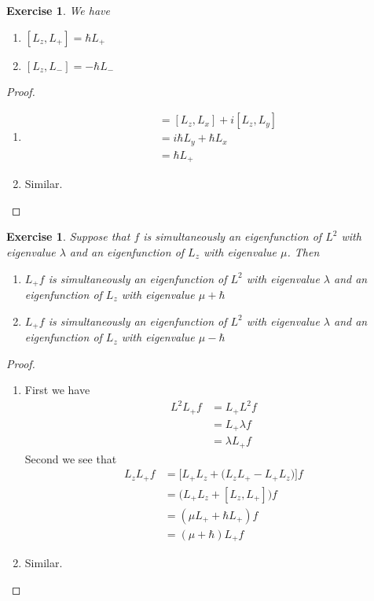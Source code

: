 \documentclass[12pt]{amsart}
\newtheorem{ex}[thm]{Exercise}
\newcommand{\lam}{\lambda}
\begin{document}
\begin{ex} We have 
\begin{enumerate}
\item $[L_z,L_+] = \hbar L_+$
\item $[L_z, L_-] = -\hbar L_-$
\end{enumerate}
\end{ex}

\begin{proof}\
\begin{enumerate}
\item 
\begin{align*}
[L_z,L_+] 
&= [L_z,L_x]+i[L_z,L_y]\\
&= i \hbar L_y + \hbar L_x\\
&= \hbar L_+
\end{align*}

\item Similar.
\end{enumerate}
\end{proof}

\begin{ex}
Suppose that $f$ is simultaneously an eigenfunction of $L^2$ with eigenvalue $\lam$ and an eigenfunction of $L_z$ with eigenvalue $\mu$. Then 
\begin{enumerate}
\item $L_+f$ is simultaneously an eigenfunction of $L^2$ with eigenvalue $\lam$ and an eigenfunction of $L_z$ with eigenvalue $\mu + \hbar$
\item  $L_+f$ is simultaneously an eigenfunction of $L^2$ with eigenvalue $\lam$ and an eigenfunction of $L_z$ with eigenvalue $ \mu - \hbar$
\end{enumerate}
\end{ex}

\begin{proof}\
\begin{enumerate}
\item  First we have
\begin{align*}
L^2L_+f 
&= L_+L^2 f\\
&= L_+ \lam f \\
&= \lam L_+ f
\end{align*}
Second we see that
\begin{align*}
L_zL_+f 
&= \bigg[ L_+L_z + \big(L_zL_+ - L_+L_z\big) \bigg]f \\
&= \big(L_+L_z + [L_z, L_+] \big)f \\
&= (\mu L_+ + \hbar L_+)f \\
&= (\mu + \hbar )L_+f  
\end{align*}
\item Similar.
\end{enumerate}
\end{proof}
\end{document}

